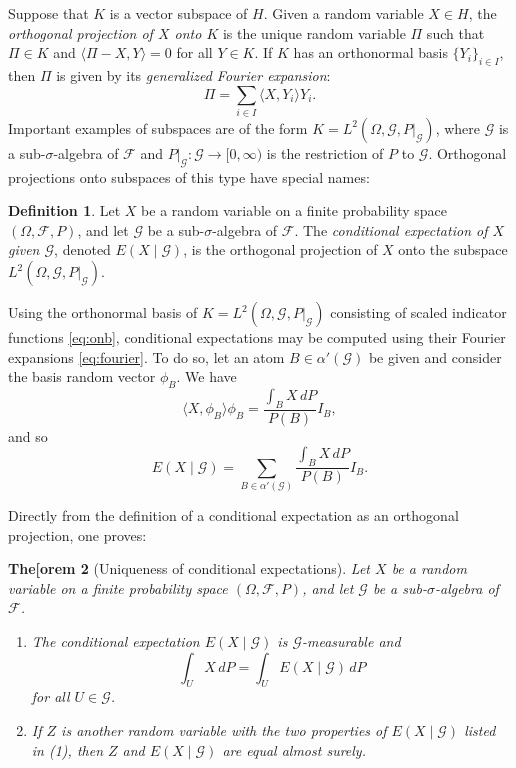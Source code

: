\documentclass[11pt]{book}
\newtheorem{thm}{The[orem}[section]
\theoremstyle{definition}
\newtheorem{defn}[thm]{Definition}
\numberwithin{equation}{section}
\begin{document}
Suppose that $K$ is a vector subspace of $H$. Given a random variable $X\in H$, the \textit{orthogonal projection of $X$ onto $K$} is the unique random variable $\Pi$ such that $\Pi\in K$ and $\langle \Pi-X, Y \rangle = 0$ for all $Y\in K$. If $K$ has an orthonormal basis $\{Y_i\}_{i\in I}$, then $\Pi$ is given by its \textit{generalized Fourier expansion}:
\begin{equation}\label{eq:fourier}
	\Pi = \sum_{i\in I} \langle X, Y_i \rangle Y_i.
\end{equation}
Important examples of subspaces are of the form $K = L^2(\Omega, \mathcal{G}, P|_{\mathcal{G}})$, where $\mathcal{G}$ is a sub-$\sigma$-algebra of $\mathcal{F}$ and $P|_{\mathcal{G}}: \mathcal{G} \to [0,\infty)$ is the restriction of $P$ to $\mathcal{G}$. Orthogonal projections onto subspaces of this type have special names:

\begin{defn}
	Let $X$ be a random variable on a finite probability space $(\Omega, \mathcal{F}, P)$, and let $\mathcal{G}$ be a sub-$\sigma$-algebra of $\mathcal{F}$. The \textit{conditional expectation of $X$ given $\mathcal{G}$}, denoted $E(X \mid \mathcal{G})$, is the orthogonal projection of $X$ onto the subspace $L^2(\Omega, \mathcal{G}, P|_{\mathcal{G}})$.
\end{defn}

Using the orthonormal basis of $K=L^2(\Omega, \mathcal{G}, P|_{\mathcal{G}})$ consisting of scaled indicator functions \eqref{eq:onb}, conditional expectations may be computed using their Fourier expansions \eqref{eq:fourier}. To do so, let an atom $B\in \alpha'(\mathcal{G})$ be given and consider the basis random vector $\phi_B$. We have
\[
	\langle X, \phi_B \rangle \phi_B = \frac{\int_B X \, dP}{P(B)}  I_B,
\]
and so
\[
	E(X \mid \mathcal{G}) = \sum_{B \in \alpha'(\mathcal{G})} \frac{\int_B X \, dP}{P(B)}  I_B.
\]

Directly from the definition of a conditional expectation as an orthogonal projection, one proves:

\begin{thm}[Uniqueness of conditional expectations]\label{thm:orthogonality-cond-exp}
	Let $X$ be a random variable on a finite probability space $(\Omega, \mathcal{F}, P)$, and let $\mathcal{G}$ be a sub-$\sigma$-algebra of $\mathcal{F}$.
	\begin{enumerate}
		\item The conditional expectation $E(X\mid \mathcal{G})$ is $\mathcal{G}$-measurable and
		      \[
			      \int_U X \, dP = \int_U E(X\mid \mathcal{G}) \, dP
		      \]
		      for all $U\in \mathcal{G}$.
		\item If $Z$ is another random variable with the two properties of $E(X\mid \mathcal{G})$ listed in (1), then $Z$ and $E(X\mid \mathcal{G})$ are equal almost surely.
	\end{enumerate}
\end{thm}
\end{document}
